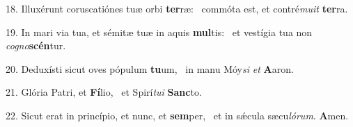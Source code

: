 18. Illuxérunt coruscatiónes tuæ orbi \textbf{ter}ræ: \ast\  commóta est, et contré\textit{mu}\textit{it} \textbf{ter}ra.\

19. In mari via tua, et sémitæ tuæ in aquis \textbf{mul}tis: \ast\  et vestígia tua non \textit{co}\textit{gno}\textbf{scén}tur.\

20. Deduxísti sicut oves pópulum \textbf{tu}um, \ast\  in manu Móy\textit{si} \textit{et} \textbf{A}aron.\

21. Glória Patri, et \textbf{Fí}lio, \ast\  et Spirí\textit{tu}\textit{i} \textbf{Sanc}to.\

22. Sicut erat in princípio, et nunc, et \textbf{sem}per, \ast\  et in sǽcula sæcu\textit{ló}\textit{rum}. \textbf{A}men.\


